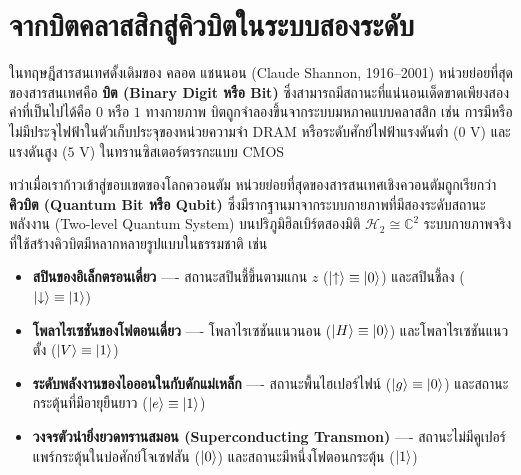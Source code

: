 \newpage
\section{จากบิตคลาสสิกสู่คิวบิตในระบบสองระดับ}

ในทฤษฎีสารสนเทศดั้งเดิมของ คลอด แชนนอน (Claude Shannon, 1916--2001) หน่วยย่อยที่สุดของสารสนเทศคือ \textbf{บิต (Binary Digit หรือ Bit)} ซึ่งสามารถมีสถานะที่แน่นอนเด็ดขาดเพียงสองค่าที่เป็นไปได้คือ $0$ หรือ $1$ ทางกายภาพ บิตถูกจำลองขึ้นจากระบบมหภาคแบบคลาสสิก เช่น การมีหรือไม่มีประจุไฟฟ้าในตัวเก็บประจุของหน่วยความจำ DRAM หรือระดับศักย์ไฟฟ้าแรงดันต่ำ ($0\text{ V}$) และแรงดันสูง ($5\text{ V}$) ในทรานซิสเตอร์ตรรกะแบบ CMOS

ทว่าเมื่อเราก้าวเข้าสู่ขอบเขตของโลกควอนตัม หน่วยย่อยที่สุดของสารสนเทศเชิงควอนตัมถูกเรียกว่า \textbf{คิวบิต (Quantum Bit หรือ Qubit)} ซึ่งมีรากฐานมาจากระบบกายภาพที่มีสองระดับสถานะพลังงาน (Two-level Quantum System) บนปริภูมิฮิลเบิร์ตสองมิติ $\mathcal{H}_2 \cong \mathbb{C}^2$ ระบบกายภาพจริงที่ใช้สร้างคิวบิตมีหลากหลายรูปแบบในธรรมชาติ เช่น
\begin{itemize}
    \item \textbf{สปินของอิเล็กตรอนเดี่ยว} ---- สถานะสปินชี้ขึ้นตามแกน $z$ ($\ket{\uparrow} \equiv \ket{0}$) และสปินชี้ลง ($\ket{\downarrow} \equiv \ket{1}$)
    \item \textbf{โพลาไรเซชันของโฟตอนเดี่ยว} ---- โพลาไรเซชันแนวนอน ($\ket{H} \equiv \ket{0}$) และโพลาไรเซชันแนวตั้ง ($\ket{V} \equiv \ket{1}$)
    \item \textbf{ระดับพลังงานของไอออนในกับดักแม่เหล็ก} ---- สถานะพื้นไฮเปอร์ไฟน์ ($\ket{g} \equiv \ket{0}$) และสถานะกระตุ้นที่มีอายุยืนยาว ($\ket{e} \equiv \ket{1}$)
    \item \textbf{วงจรตัวนำยิ่งยวดทรานสมอน (Superconducting Transmon)} ---- สถานะไม่มีคูเปอร์แพร์กระตุ้นในบ่อศักย์โจเซฟสัน ($\ket{0}$) และสถานะมีหนึ่งโฟตอนกระตุ้น ($\ket{1}$)
\end{itemize}

